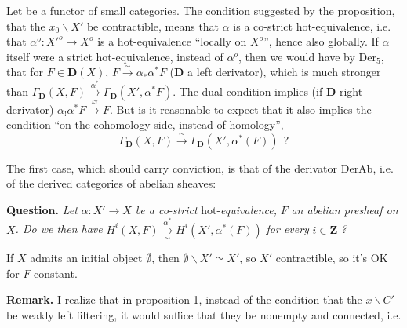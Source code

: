 \documentclass[11pt]{article}
\newcommand{\msp}[1]{\marginpar{\footnotesize [#1]}}
\begin{document}
Let  be a functor of small categories. The condition suggested by the proposition, that the $x_0\backslash X'$ be contractible, means that $\alpha$ is a co-strict hot-equivalence, i.e. that $\alpha^{o} : X'^{o} \longrightarrow X^{o}$ is a hot-equivalence ``locally on $X^{o}$'', hence also globally. If $\alpha$
\msp{page 5}
itself were a strict hot-equivalence, instead of $\alpha^{o}$, then we would have by $\mathrm{Der}_5$, that for $F \in \mathbf{D}(X)$, $F \xrightarrow{\;\sim\;} \alpha_*\alpha^* F$ ($\mathbf{D}$ a left derivator), which is much stronger than $\Gamma_{\mathbf{D}}(X, F) \xrightarrow[\sim]{\alpha^*} \Gamma_{\mathbf{D}}(X', \alpha^* F)$. The dual condition implies (if $\mathbf{D}$ right derivator) $\alpha_!\alpha^* F \xrightarrow{\;\sim\;} F$. But is it reasonable to expect that it also implies the condition ``on the cohomology side, instead of homology'',
\[ \Gamma_{\mathbf{D}}(X, F) \xrightarrow{\;\sim\;} \Gamma_{\mathbf{D}}(X', \alpha^*(F)) \ \ ? \]

The first case, which should carry conviction, is that of the derivator DerAb, i.e. of the derived categories of abelian sheaves:

\textbf{Question.} \textit{Let} $\alpha : X' \longrightarrow X$ \textit{be a co-strict} hot-\textit{equivalence,} $F$ \textit{an abelian presheaf on} $X$\textit{. Do we then have} $H^i(X, F) \xrightarrow[\sim]{\alpha^*} H^i(X', \alpha^*(F))$ \textit{for every} $i \in \mathbf{Z}$ \textit{?}

If $X$ admits an initial object $\emptyset$, then $\emptyset\backslash X' \simeq X'$, so $X'$ contractible, so it's OK for $F$ constant.

\textbf{Remark.} I realize that in proposition 1, instead of the condition that the $x\backslash C'$ be weakly left filtering, it would suffice that they be nonempty and connected, i.e.
\end{document}
